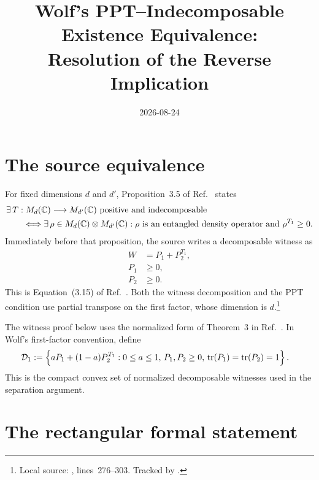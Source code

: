 \documentclass{article}
\title{Wolf's PPT--Indecomposable Existence Equivalence:\\
Resolution of the Reverse Implication}
\author{}
\date{2026-08-24}
\begin{document}
\maketitle
{}

\section{The source equivalence}

For fixed dimensions $d$ and $d'$, Proposition~3.5 of
Ref.~\cite{Wolf2012Quantum} states
\begin{align}
    &\exists\,T:M_{d}(\mathbb{C})\longrightarrow M_{d'}(\mathbb{C})
      \text{ positive and indecomposable}\nonumber\\
    &\qquad\Longleftrightarrow
      \exists\,\rho\in M_{d}(\mathbb{C})\otimes M_{d'}(\mathbb{C}):
      \rho\text{ is an entangled density operator and }\rho^{T_1}\geq0.
    \label{eq:wolf_prop3_5_reverse_implication_source_equivalence}
\end{align}
Immediately before that proposition, the source writes a decomposable witness
as
\begin{align}
    W
        &=P_1+P_2^{T_1},
    \label{eq:wolf_prop3_5_reverse_implication_source_decomposition}\\
    P_1
        &\geq0,
    \label{eq:wolf_prop3_5_reverse_implication_first_positive_part}\\
    P_2
        &\geq0.
    \label{eq:wolf_prop3_5_reverse_implication_second_positive_part}
\end{align}
This is Equation~(3.15) of Ref.~\cite{Wolf2012Quantum}. Both the witness
decomposition and the PPT condition use partial transpose on the first factor,
whose dimension is $d$.\footnote{Local source:
,
lines~276--303. Tracked by .}

The witness proof below uses the normalized form of Theorem~3 in
Ref.~\cite{LewensteinKrausCiracHorodecki2000}. In Wolf's first-factor
convention, define
\begin{align}
    \mathcal D_1
        &:=
        \left\{aP_1+(1-a)P_2^{T_1}:
          0\leq a\leq1,\,
          P_1,P_2\geq0,\,
          \operatorname{tr}(P_1)=\operatorname{tr}(P_2)=1\right\}.
    \label{eq:wolf_prop3_5_reverse_implication_normalized_decomposable_set}
\end{align}
This is the compact convex set of normalized decomposable witnesses used in
the separation argument.

\section{The rectangular formal statement}
\end{document}
